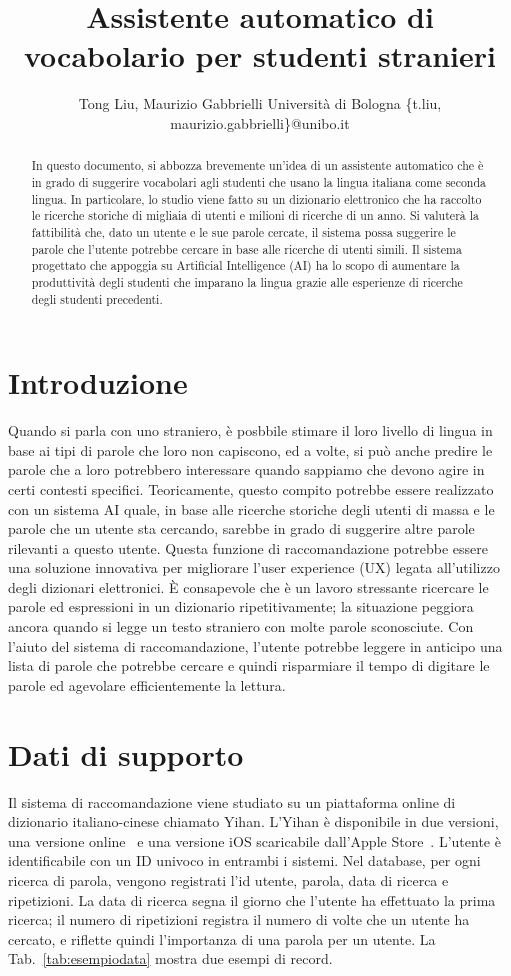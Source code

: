 \documentclass{article}
\title{Assistente automatico di vocabolario per studenti stranieri}
\author{
    Tong Liu, Maurizio Gabbrielli
    \affiliations
    Universit\`a di Bologna
    \emails
    \{t.liu, maurizio.gabbrielli\}@unibo.it
}
\begin{document}
\maketitle

\begin{abstract}
	In questo documento, si abbozza brevemente 
	un'idea di un assistente automatico che è in 
	grado di suggerire vocabolari agli studenti 
	che usano la lingua italiana come seconda lingua.
	In particolare, lo studio viene fatto
	su un dizionario elettronico che ha raccolto le ricerche storiche di migliaia di utenti e milioni di ricerche di un anno.
	Si valuterà la fattibilità che, dato un utente e le sue parole cercate,  il sistema possa suggerire le parole che l'utente potrebbe cercare in base alle ricerche di utenti simili.
	Il sistema progettato che appoggia su Artificial Intelligence (AI) ha lo scopo di aumentare la produttività degli studenti che imparano la lingua grazie alle esperienze di ricerche degli studenti precedenti. 
\end{abstract}

\section{Introduzione}
Quando si parla con uno straniero, \`e posbbile stimare il loro livello
di lingua in base ai tipi di parole che loro non capiscono,
ed a volte, si pu\`o anche predire le parole che a loro potrebbero interessare quando sappiamo che devono agire in certi contesti specifici. 
Teoricamente, questo compito potrebbe essere realizzato con un sistema AI quale, in base alle ricerche storiche degli utenti di massa e le parole che un utente sta cercando, sarebbe in grado di suggerire altre parole rilevanti a questo utente.
Questa funzione di raccomandazione potrebbe essere una soluzione innovativa per migliorare l'user experience (UX) legata all'utilizzo degli dizionari elettronici. È consapevole che è un lavoro stressante ricercare le parole ed espressioni in un dizionario ripetitivamente; la situazione peggiora ancora quando si legge un testo straniero con molte parole sconosciute. 
Con l'aiuto del sistema di raccomandazione, l'utente potrebbe leggere in anticipo una lista di parole che potrebbe cercare e quindi risparmiare il tempo di digitare le parole ed agevolare efficientemente la lettura.

\section{Dati di supporto}
Il sistema di raccomandazione viene studiato su un piattaforma online di dizionario italiano-cinese chiamato Yihan. L'Yihan è disponibile in due versioni, una versione online~\cite{yihanwebsite} e una versione iOS scaricabile dall'Apple Store~\cite{yihanapp}. L'utente \`e identificabile con un ID univoco in entrambi i sistemi. Nel database, per ogni ricerca di parola, vengono registrati l'id utente, parola, data di ricerca e ripetizioni. La data di ricerca segna il giorno che l'utente ha effettuato la prima ricerca; il numero di ripetizioni registra il numero di volte che un utente ha cercato, e riflette quindi l'importanza di una parola per un utente. La Tab.~\ref{tab:esempiodata} mostra due esempi di record.
\end{document}
